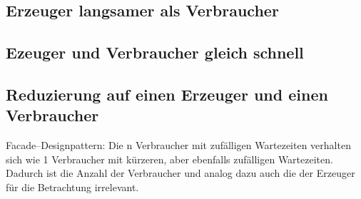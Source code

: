 
\subsection{Erzeuger langsamer als Verbraucher} %
\label{sub:erzeuger_langsamer_als_verbraucher}


\subsection{Ezeuger und Verbraucher gleich schnell} %
\label{sub:ezeuger_und_verbraucher_gleich_schnell}


\subsection{Reduzierung auf einen Erzeuger und einen Verbraucher} %
\label{sub:reduzierung_auf_einen_erzeuger_und_einen_verbraucher}

Facade–Designpattern: Die n Verbraucher mit zufälligen Wartezeiten verhalten sich wie 1 Verbraucher mit kürzeren, aber ebenfalls zufälligen Wartezeiten. Dadurch ist die Anzahl der Verbraucher und analog dazu auch die der Erzeuger für die Betrachtung irrelevant.


